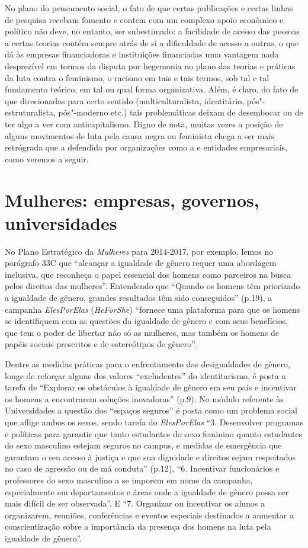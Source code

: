 No plano do pensamento social, o fato de que certas publicações e certas
linhas de pesquisa recebam fomento e contem com um complexo apoio
econômico e político não deve, no entanto, ser subestimado: a facilidade
de acesso das pessoas a certas teorias contém sempre atrás de si a
dificuldade de acesso a outras, o que dá às empresas financiadoras e
instituições financiadas uma vantagem nada desprezível em termos da
disputa por hegemonia no plano das teorias e práticas da luta contra o
feminismo, o racismo em tais e tais termos, sob tal e tal fundamento
teórico, em tal ou qual forma organizativa. Além, é claro, do fato de
que direcionadas para certo sentido (multiculturalista, identitário,
pós"-estruturalista, pós"-moderno etc.) tais problemáticas deixam de
desembocar ou de ter algo a ver com anticapitalismo. Digno de nota,
muitas vezes a posição de alguns movimentos de luta pela causa negra ou
feminista chega a ser mais retrógrada que a defendida por organizações 
como a  e entidades empresariais, como veremos a seguir. 

\chapter{ Mulheres: empresas, governos, universidades}

No Plano Estratégico da \emph{ Mulheres} para 2014-2017, por exemplo,
lemos no parágrafo 33C que ``alcançar a igualdade de gênero requer uma
abordagem inclusiva, que reconheça o papel essencial dos homens como
parceiros na busca pelos direitos das mulheres''. Entendendo que
``Quando os homens têm priorizado a igualdade de gênero, grandes
resultados têm sido conseguidos'' (p.19), a campanha \emph{ElesPorElas}
(\emph{HeForShe}) ``fornece uma plataforma para que os homens se
identifiquem com as questões da igualdade de gênero e com seus
benefícios, que tem o poder de libertar não só as mulheres, mas também
os homens de papéis sociais prescritos e de estereótipos de gênero''.

Dentre as medidas práticas para o enfrentamento das desigualdades de
gênero, longe de reforçar alguns dos valores ``excludentes'' do
identitarismo, é posta a tarefa de ``Explorar os obstáculos à igualdade
de gênero em seu país e incentivar os homens a encontrarem soluções
inovadoras'' (p.9). No módulo referente às Universidades a questão dos
``espaços seguros'' é posta como um problema social que aflige ambos os
sexos, sendo tarefa do \emph{ElesPorElas} ``3. Desenvolver programas e
políticas para garantir que tanto estudantes do sexo feminino quanto
estudantes do sexo masculino estejam seguros no campus, e medidas de
emergência que garantam o seu acesso à justiça e que sua dignidade e
direitos sejam respeitados no caso de agressão ou de má conduta''
(p.12), ``6. Incentivar funcionários e professores do sexo masculino a
se imporem em nome da campanha, especialmente em departamentos e áreas
onde a igualdade de gênero possa ser mais difícil de ser observada''. E
``7. Organizar ou incentivar os alunos a organizarem, reuniões,
conferências e eventos especiais destinados a aumentar a conscientização
sobre a importância da presença dos homens na luta pela igualdade de
gênero''.

